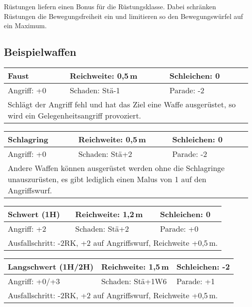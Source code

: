 \documentclass[../../Heldenanleitung2]{subfiles}
\begin{document}
Rüstungen liefern einen Bonus für die Rüstungsklasse. Dabei schränken Rüstungen die Bewegungsfreiheit ein und limitieren so den Bewegungswürfel auf ein Maximum.

\subsection{Beispielwaffen}

\begin{tabular}{|p{}|p{}|p{}|}
\hline
\textbf{Faust} & Reichweite: 0,5\,m & Schleichen: 0 \\
\hline
Angriff: +0 & Schaden: Stä-1 & Parade: -2\\
\hline
\multicolumn{3}{|p{0.99\textwidth}|}{Schlägt der Angriff fehl und hat das Ziel eine Waffe ausgerüstet, so wird ein Gelegenheitsangriff provoziert.} \\
\hline
\end{tabular}
\newline \newline\newline
\begin{tabular}{|p{}|p{}|p{}|}
\hline
\textbf{Schlagring} & Reichweite: 0,5\,m & Schleichen: 0\\
\hline
Angriff: +0 & Schaden: Stä+2 & Parade: -2 \\
\hline
\multicolumn{3}{|p{0.99\textwidth}|}{Andere Waffen können ausgerüstet werden ohne die Schlagringe unauszurüsten, es gibt lediglich einen Malus von 1 auf den Angriffswurf.} \\
\hline
\end{tabular}
\newline \newline\newline
\begin{tabular}{|p{}|p{}|p{}|}
\hline
\textbf{Schwert (1H)} & Reichweite: 1,2\,m & Schleichen: 0\\
\hline
Angriff: +2 & Schaden: Stä+2 & Parade: +0\\
\hline
\multicolumn{3}{|p{0.99\textwidth}|}{Ausfallschritt: -2RK, +2 auf Angriffswurf, Reichweite +0,5\,m.} \\
\hline
\end{tabular}
\newline \newline\newline
\begin{tabular}{|p{}|p{}|p{}|}
\hline
\textbf{Langschwert (1H/2H)} & Reichweite: 1,5\,m & Schleichen: -2 \\
\hline
Angriff: +0/+3 & Schaden: Stä+1W6 & Parade: +1\\
\hline
\multicolumn{3}{|p{0.99\textwidth}|}{Ausfallschritt: -2RK, +2 auf Angriffswurf, Reichweite +0,5\,m.} \\
\hline
\end{tabular}
\end{document}
